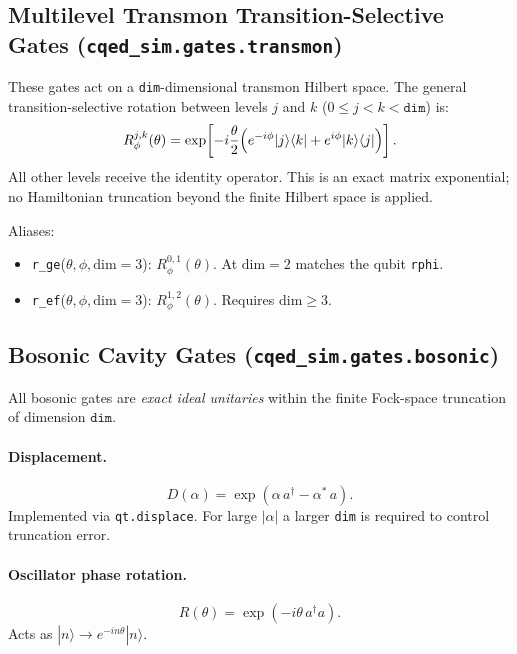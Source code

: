\documentclass[11pt]{article}
\begin{document}
\subsection{Multilevel Transmon Transition-Selective Gates
            (\texttt{cqed\_sim.gates.transmon})}
\label{subsec:transmon_gates}

\noindent
These gates act on a \texttt{dim}-dimensional transmon Hilbert space. The
general transition-selective rotation between levels \(j\) and \(k\)
(\(0 \le j < k < \texttt{dim}\)) is:
\[
  R^{j,k}_{\phi}(\theta)
  = \exp\!\left[
    -i\frac{\theta}{2}
    \Bigl(
      e^{-i\phi}|j\rangle\langle k|
      + e^{i\phi}|k\rangle\langle j|
    \Bigr)
  \right].
\]
All other levels receive the identity operator. This is an exact matrix
exponential; no Hamiltonian truncation beyond the finite Hilbert space is
applied.

\noindent
Aliases:
\begin{itemize}[leftmargin=1.5em]
  \item \texttt{r\_ge}(\(\theta, \phi, \text{dim}=3\)):
        \(R^{0,1}_\phi(\theta)\).  At \(\text{dim}=2\) matches
        the qubit \texttt{rphi}.
  \item \texttt{r\_ef}(\(\theta, \phi, \text{dim}=3\)):
        \(R^{1,2}_\phi(\theta)\).  Requires \(\text{dim} \ge 3\).
\end{itemize}

\subsection{Bosonic Cavity Gates (\texttt{cqed\_sim.gates.bosonic})}
\label{subsec:bosonic_gates}

\noindent
All bosonic gates are \emph{exact ideal unitaries} within the finite
Fock-space truncation of dimension \(\texttt{dim}\).

\paragraph{Displacement.}
\[
  D(\alpha) = \exp\!\left(\alpha\,a^\dagger - \alpha^*\,a\right).
\]
Implemented via \texttt{qt.displace}. For large \(|\alpha|\) a larger
\texttt{dim} is required to control truncation error.

\paragraph{Oscillator phase rotation.}
\[
  R(\theta) = \exp(-i\theta\,a^\dagger a).
\]
Acts as \(|n\rangle \to e^{-in\theta}|n\rangle\).
\end{document}
